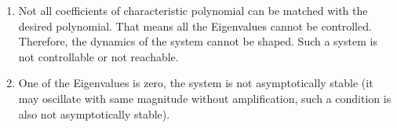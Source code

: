 \begin{enumerate}
	\item Not all coefficients of characteristic polynomial can be matched with the desired polynomial. That means all the Eigenvalues cannot be controlled. Therefore, the dynamics of the system cannot be shaped. Such a system is not controllable or not reachable.
	\item One of the Eigenvalues is zero, the system is not asymptotically stable (it may oscillate with same magnitude without amplification, such a condition is also not asymptotically stable).
\end{enumerate}